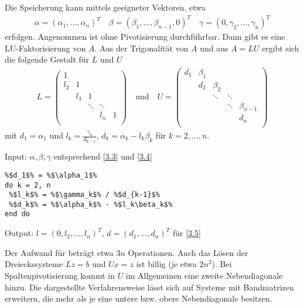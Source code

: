 Die Speicherung kann mittels geeigneter Vektoren, etwa
\begin{align}
	\label{3.4}
	\alpha = (\alpha_1,...,\alpha_n)^T\quad \beta=(\beta_1,...,\beta_{n-1},0)^T\quad \gamma =(0,\gamma_2,...,\gamma_n)^T
\end{align}
erfolgen. Angenommen  ist ohne Pivotisierung durchführbar. Dann gibt es eine LU-Faktorisierung von $A$. Aus der Trigonalität von $A$ und aus $A=LU$ ergibt sich die folgende Gestalt für $L$ und $U$
\begin{align}
	\label{3.5}
	L = \begin{pmatrix}
		1 & & & & \\
		l_2 & 1 & & & \\
		& l_3 & 1 & & \\
		& & \ddots & \ddots & \\
		& & & l_n & 1 \\
	\end{pmatrix}\quad\text{und}\quad U=\begin{pmatrix}
		d_1 & \beta_1 & & & \\
		& d_2 & \beta_2 & & \\
		& & \ddots & \ddots & \\
		& & & \ddots & \beta_{n-1} \\
		& & & & d_n \\ 
	\end{pmatrix}
\end{align}
mit $d_1=\alpha_1$ und $l_k=\frac{\gamma_k}{d_{k-1}}$, $d_k=\alpha_k-l_k\beta_k$ für $k=2,...,n$.

\begin{algorithm}
	Input: $\alpha, \beta, \gamma$ entsprechend \cref{3.3} und \cref{3.4}
	\begin{lstlisting}
%$d_1$% = %$\alpha_1$%
do k = 2, n
 %$l_k$% = %$\gamma_k$% / %$d_{k-1}$%
 %$d_k$% = %$\alpha_k$% - %$l_k\beta_k$%
end do
	\end{lstlisting}
	Output: $l=(0,l_2,...,l_n)^T$, $d=(d_1,...,d_n)^T$ für \cref{3.5}
\end{algorithm}

\begin{remark}
	Der Aufwand für  beträgt etwa $3n$ Operationen. Auch das Lösen der Dreieckssysteme $Lz=b$ und $Ux=z$ ist billig (je etwa $2n^2$). Bei Spaltenpivotisierung kommt in $U$ im Allgemeinen eine zweite Nebendiagonale hinzu. Die dargestellte Verfahrensweise lässt sich auf Systeme mit Bandmatrizen erweitern, die mehr als je eine untere bzw. obere Nebendiagonale besitzen.
\end{remark}